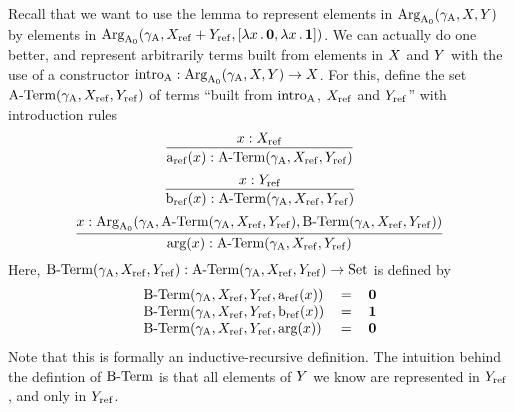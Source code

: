 \documentclass{article}
\begin{document}
Recall that we want to use the lemma to represent elements in
$\text{Arg}_{\mathrm{A}_0}(\gamma_{\mathrm{A}}, X, Y)$ by elements in $\text{Arg}_{\mathrm{A}_0}(\gamma_{\mathrm{A}}, X_{\mathrm{ref}} +Y_{\mathrm{ref}},
[\lambda x\,.\,\mathbf{0}, \lambda x\,.\,\mathbf{1}])$. We can actually do one
better, and represent arbitrarily terms built from elements in $X$ and
$Y$ with the use of a constructor $\text{intro}_{\mathrm{A}} : \text{Arg}_{\mathrm{A}_0}(\gamma_{\mathrm{A}}, X, Y) \to
X$. For this, define the set $\text{A-Term}(\gamma_{\mathrm{A}}, X_{\mathrm{ref}}, Y_{\mathrm{ref}})$ of terms
``built from $\text{intro}_{\mathrm{A}}$, $X_{\mathrm{ref}}$ and $Y_{\mathrm{ref}}$'' with introduction rules
%
\[
\infer{\termAref(x) : \Aterm(\gammaA, \Xref, \Yref)}{x : \Xref}
\]
%
%
\[
\infer{\termBref(x) : \Aterm(\gammaA, \Xref, \Yref)}{x : \Yref}
\]
%
%
\[
\infer{\termArg(x) : \Aterm(\gammaA, \Xref, \Yref)}{x : \ArgAp(\gammaA, \Aterm(\gammaA, \Xref, \Yref), \Bterm(\gammaA, \Xref, \Yref))}
\]
Here, $\text{B-Term}(\gamma_{\mathrm{A}}, X_{\mathrm{ref}}, Y_{\mathrm{ref}}) : \text{A-Term}(\gamma_{\mathrm{A}}, X_{\mathrm{ref}}, Y_{\mathrm{ref}}) \to \text{Set}$ is defined by
\[
\begin{tabular}{lcr}
$\Bterm(\gammaA, \Xref, \Yref, \termAref(x))$ & $=$ & $\zero$ \\
$\Bterm(\gammaA, \Xref, \Yref, \termBref(x))$ & $=$ & $\one$  \\
$\Bterm(\gammaA, \Xref, \Yref, \termArg(x))$  & $=$ & $\zero$
\end{tabular}
\]
Note that this is formally an inductive-recursive definition.
The intuition behind the defintion of $\text{B-Term}$ is that all elements of
$Y$ we know are represented in $Y_{\mathrm{ref}}$, and only in $Y_{\mathrm{ref}}$. 
\end{document}
